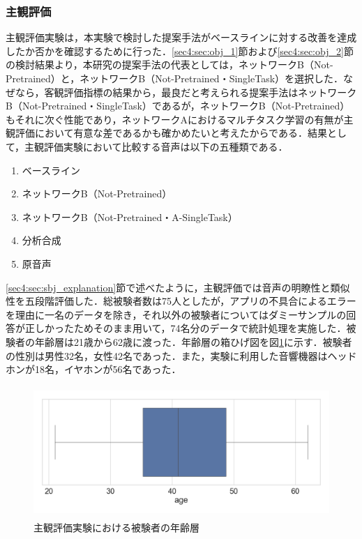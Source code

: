 \documentclass[12pt]{jarticle}
\numberwithin{equation}{section}    %
\numberwithin{figure}{section}      %
\numberwithin{table}{section}      %
\begin{document}
\subsubsection{主観評価}
主観評価実験は，本実験で検討した提案手法がベースラインに対する改善を達成したか否かを確認するために行った．\ref{sec4:sec:obj_1}節および\ref{sec4:sec:obj_2}節の検討結果より，本研究の提案手法の代表としては，ネットワークB（Not-Pretrained）と，ネットワークB（Not-Pretrained・SingleTask）を選択した．なぜなら，客観評価指標の結果から，最良だと考えられる提案手法はネットワークB（Not-Pretrained・SingleTask）であるが，ネットワークB（Not-Pretrained）もそれに次ぐ性能であり，ネットワークAにおけるマルチタスク学習の有無が主観評価において有意な差であるかも確かめたいと考えたからである．結果として，主観評価実験において比較する音声は以下の五種類である．
\begin{enumerate}
    \item ベースライン
    \item ネットワークB（Not-Pretrained）
    \item ネットワークB（Not-Pretrained・A-SingleTask）
    \item 分析合成
    \item 原音声
\end{enumerate}
\ref{sec4:sec:sbj_explanation}節で述べたように，主観評価では音声の明瞭性と類似性を五段階評価した．総被験者数は75人としたが，アプリの不具合によるエラーを理由に一名のデータを除き，それ以外の被験者についてはダミーサンプルの回答が正しかったためそのまま用いて，74名分のデータで統計処理を実施した．被験者の年齢層は21歳から62歳に渡った．年齢層の箱ひげ図を図\ref{sec4:fig:age}に示す．被験者の性別は男性32名，女性42名であった．また，実験に利用した音響機器はヘッドホンが18名，イヤホンが56名であった．
\begin{figure}[bt]
    \centering
    \includegraphics[height=50mm]{./figure/sec4/sbj/age.png}
    \caption{主観評価実験における被験者の年齢層}
    \label{sec4:fig:age}
\end{figure}
\end{document}
